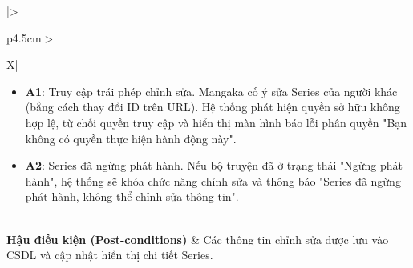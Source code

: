 \begin{table}[H]
\begin{tabularx}{\textwidth}{|>{\raggedright\arraybackslash\bfseries}p{4.5cm}|>{\raggedright\arraybackslash}X|}
\begin{minipage}[t]{\linewidth}
\begin{itemize}[leftmargin=*]
        \item \textbf{A1}: Truy cập trái phép chỉnh sửa. Mangaka cố ý sửa Series của người khác (bằng cách thay đổi ID trên URL). Hệ thống phát hiện quyền sở hữu không hợp lệ, từ chối quyền truy cập và hiển thị màn hình báo lỗi phân quyền "Bạn không có quyền thực hiện hành động này".
        \item \textbf{A2}: Series đã ngừng phát hành. Nếu bộ truyện đã ở trạng thái "Ngừng phát hành", hệ thống sẽ khóa chức năng chỉnh sửa và thông báo "Series đã ngừng phát hành, không thể chỉnh sửa thông tin".
    \end{itemize}
\end{minipage} \\ \hline
\textbf{Hậu điều kiện (Post-conditions)} & Các thông tin chỉnh sửa được lưu vào CSDL và cập nhật hiển thị chi tiết Series. \\ \hline
\end{tabularx}
\caption{Đặc tả UC-09: Cập nhật thông tin Series}
\label{tab:uc09}
\end{table}

